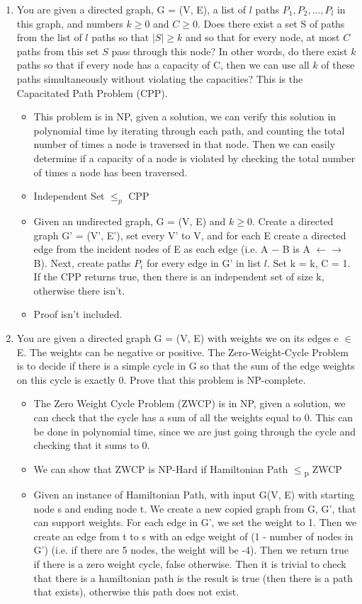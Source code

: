 \documentclass[]{article}
\begin{document}
\begin{enumerate}
\begin{itemize}
    \end{itemize}
    \item You are given a directed graph, G = (V, E), a list of $l$ paths $P_1, P_2, ..., P_l$ in this graph, and numbers $k \geq 0$ and $C \geq 0$. Does there exist a set S of paths from the list of $l$ paths so that $|S| \geq k$ and so that for every node, at most $C$ paths from this set $S$ pass through this node? In other words, do there exist $k$ paths so that if every node has a capacity of C, then we can use all $k$ of these paths simultaneously without violating the capacities? This is the Capacitated Path Problem (CPP). 
    \begin{itemize}
        \item This problem is in NP, given a solution, we can verify this solution in polynomial time by iterating through each path, and counting the total number of times a node is traversed in that node. Then we can easily determine if a capacity of a node is violated by checking the total number of times a node has been traversed.
        \item Independent Set $\leq_p$ CPP
        \item Given an undirected graph, G = (V, E) and $k \geq 0$. Create a directed graph G' = (V', E'), set every V' to V, and for each E create a directed edge from the incident nodes of E as each edge (i.e. A $-$ B is A $\leftarrow\rightarrow$ B). Next, create paths $P_i$ for every edge in G' in list $l$. Set k = k, C = 1. If the CPP returns true, then there is an independent set of size k, otherwise there isn't.
        \item Proof isn't included.
    \end{itemize}
    \item You are given a directed graph G = (V, E) with weights we on its edges e $\in$ E. The weights can be negative or positive. The Zero-Weight-Cycle Problem is to decide if there is a simple cycle in G so that the sum of the edge weights on this cycle is exactly 0. Prove that this problem is NP-complete.
    \begin{itemize}
        \item The Zero Weight Cycle Problem (ZWCP) is in NP, given a solution, we can check that the cycle has a sum of all the weights equal to 0. This can be done in polynomial time, since we are just going through the cycle and checking that it sums to 0.
        \item We can show that ZWCP is NP-Hard if Hamiltonian Path $\leq$\textsubscript{p} ZWCP
        \item Given an instance of Hamiltonian Path, with input G(V, E) with starting node s and ending node t. We create a new copied graph from G, G', that can support weights. For each edge in G', we set the weight to 1. Then we create an edge from t to s with an edge weight of (1 - number of nodes in G') (i.e. if there are 5 nodes, the weight will be -4). Then we return true if there is a zero weight cycle, false otherwise. Then it is trivial to check that there is a hamiltonian path is the result is true (then there is a path that exists), otherwise this path does not exist.

\end{itemize}
\end{enumerate}
\end{document}
